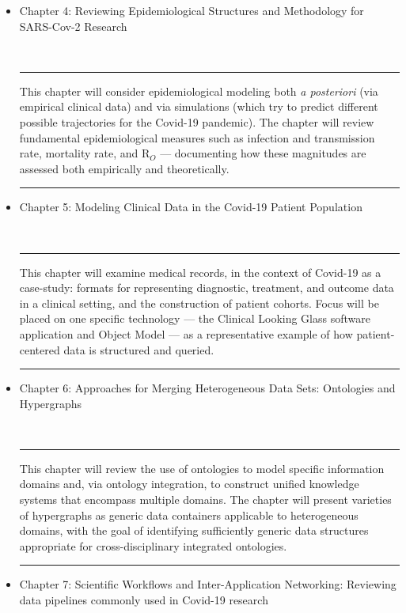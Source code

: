 \documentclass{statsoc}
\newenvironment{summary}{\\\vspace{-4pt}%
%
%
\noindent\hfil\textcolor{rgrey!50!purple}{\rule{0.5\textwidth}{.4pt}}\hfil

\hspace{-2cm}\begin{minipage}{1.02\textwidth}\fontfamily{phv}\fontsize{9}{11}\selectfont}%
{\\\vspace{-1em}\end{minipage}
{\begin{center}\textcolor{rgrey!50!yellow}{\rule{0.5\textwidth}{.4pt}}\end{center}}
\vspace{2em}}%
\begin{document}
{\begin{description}
\begin{itemize}
\item Chapter 4: Reviewing Epidemiological Structures and Methodology for SARS-Cov-2 Research

\begin{summary}
This chapter will consider epidemiological modeling both \textit{a posteriori}
(via empirical clinical data) and via simulations (which try to 
predict different possible trajectories for the Covid-19 pandemic).  
The chapter will review fundamental epidemiological measures such 
as infection and transmission rate, mortality rate, and R$_O$ --- 
documenting how these magnitudes are assessed both empirically and theoretically. 
\end{summary}

\item Chapter 5: Modeling Clinical Data in the Covid-19 Patient Population  

\begin{summary}
This chapter will examine medical records, in the context of 
Covid-19 as a case-study: formats for representing 
diagnostic, treatment, and outcome data in a clinical setting, 
and the construction of patient cohorts.  Focus will be 
placed on one specific technology --- the 
Clinical Looking Glass software application and Object Model --- 
as a representative example of how patient-centered 
data is structured and queried.
\end{summary}

\end{itemize}

\item[Part II: Creating a Cross-Disciplinary Ecosystem for Covid-19]

\begin{itemize}

\item Chapter 6: Approaches for Merging Heterogeneous Data Sets: Ontologies and Hypergraphs

\begin{summary}
This chapter will review the use of ontologies to model 
specific information domains and, via ontology integration, 
to construct unified knowledge systems that encompass 
multiple domains.  The chapter will present varieties 
of hypergraphs as generic data containers applicable 
to heterogeneous domains, with the goal of identifying 
sufficiently generic data structures appropriate 
for cross-disciplinary integrated ontologies.   
\end{summary}

\item Chapter 7: Scientific Workflows and Inter-Application Networking: 
Reviewing data pipelines commonly used in Covid-19 research


\end{itemize}
\end{description}}
\end{document}
